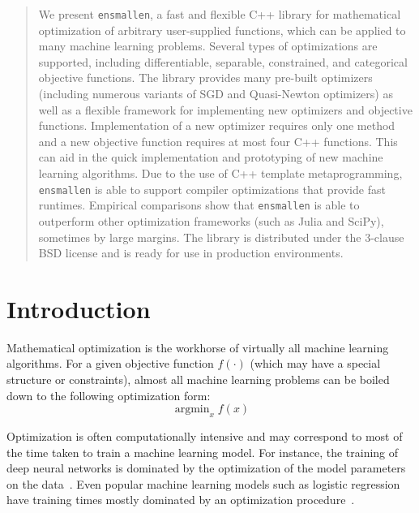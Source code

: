 \documentclass{article}
\DeclareMathOperator*{\argmindown}{argmin}   %
\begin{document}
\begin{abstract}
\vspace*{-0.3em}
We present {\tt ensmallen}, a fast and flexible C++ library for mathematical optimization of 
arbitrary user-supplied functions,
which can be applied to many machine learning problems.
Several types of optimizations are supported, including differentiable,
separable, constrained, and categorical objective functions.
The library provides many pre-built optimizers
(including numerous variants of SGD and Quasi-Newton optimizers)
as well as a flexible framework for implementing new optimizers and objective functions.
Implementation of a new optimizer requires only one method
and a new objective function requires at most four C++ functions. 
This can aid in the quick implementation and prototyping of new machine learning algorithms.
Due to the use of C++ template metaprogramming, {\tt ensmallen} is able to
support compiler optimizations that provide fast runtimes.
Empirical comparisons show that {\tt ensmallen} is able to outperform other
optimization frameworks (such as Julia and SciPy), sometimes by large margins.
The library is distributed under the 3-clause BSD license and is ready for use
in production environments.
\end{abstract}

\section{Introduction}

Mathematical optimization is the workhorse of virtually all machine learning
algorithms.  For a given objective function $f(\cdot)$
(which may have a special structure or constraints),
almost all machine learning problems can be boiled down
to the following optimization form:
%
\begin{equation}
\argmindown_x f(x)
\end{equation}
\vspace*{-1.5em}

Optimization is often computationally intensive and may correspond
to most of the time taken to train a machine learning model.  For instance, the
training of deep neural networks is dominated by the optimization of the model
parameters on the data~\cite{schmidhuber2015deep}.
Even popular machine learning models such as logistic regression
have training times mostly dominated by an optimization procedure~\cite{kingma2015adam}.
%
\end{document}
